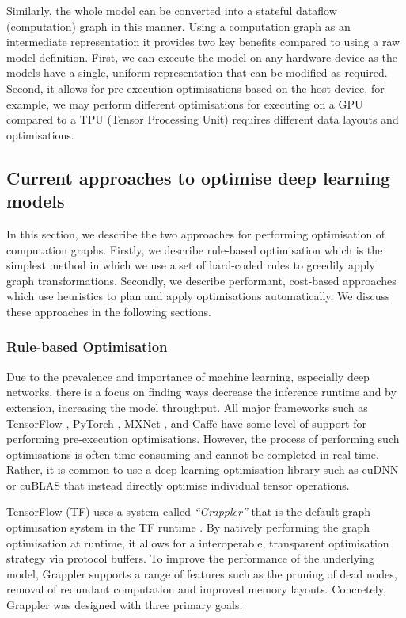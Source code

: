 Similarly, the whole model can be converted into a stateful dataflow (computation) graph in this manner. Using a computation graph as an intermediate representation it provides two key benefits compared to using a raw model definition. First, we can execute the model on any hardware device as the models have a single, uniform representation that can be modified as required. Second, it allows for pre-execution optimisations based on the host device, for example, we may perform different optimisations for executing on a GPU compared to a TPU (Tensor Processing Unit) requires different data layouts and optimisations.

\subsection{Current approaches to optimise deep learning models}
\label{sec:bg:subsec:currentapp}

In this section, we describe the two approaches for performing optimisation of computation graphs. Firstly, we describe rule-based optimisation which is the simplest method in which we use a set of hard-coded rules to greedily apply graph transformations. Secondly, we describe performant, cost-based approaches which use heuristics to plan and apply optimisations automatically. We discuss these approaches in the following sections.

\subsubsection{Rule-based Optimisation}
\label{sec:bg:subsec:rbo}

Due to the prevalence and importance of machine learning, especially deep networks, there is a focus on finding ways decrease the inference runtime and by extension, increasing the model throughput. All major frameworks such as TensorFlow \cite{tensorflow2015-whitepaper}, PyTorch \cite{pytorch}, MXNet \cite{chen2015mxnet}, and Caffe \cite{jia2014caffe} have some level of support for performing pre-execution optimisations. However, the process of performing such optimisations is often time-consuming and cannot be completed in real-time. Rather, it is common to use a deep learning optimisation library such as cuDNN \cite{chetlur2014cudnn} or cuBLAS \cite{cublas2008} that instead directly optimise individual tensor operations.

TensorFlow (TF) uses a system called \textit{``Grappler''} that is the default graph optimisation system in the TF runtime \cite{larsen2019tensorflow}. By natively performing the graph optimisation at runtime, it allows for a interoperable, transparent optimisation strategy via protocol buffers. To improve the performance of the underlying model, Grappler supports a range of features such as the pruning of dead nodes, removal of redundant computation and improved memory layouts. Concretely, Grappler was designed with three primary goals:

